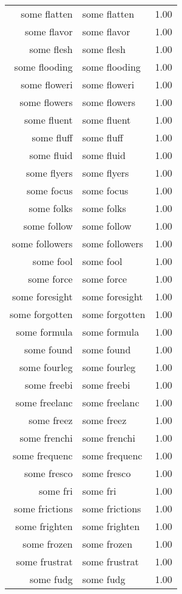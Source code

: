 \begin{table}[ht]
\begin{tabular}{rlr}
  some flatten & some flatten & 1.00 \\ 
  some flavor & some flavor & 1.00 \\ 
  some flesh & some flesh & 1.00 \\ 
  some flooding & some flooding & 1.00 \\ 
  some floweri & some floweri & 1.00 \\ 
  some flowers & some flowers & 1.00 \\ 
  some fluent & some fluent & 1.00 \\ 
  some fluff & some fluff & 1.00 \\ 
  some fluid & some fluid & 1.00 \\ 
  some flyers & some flyers & 1.00 \\ 
  some focus & some focus & 1.00 \\ 
  some folks & some folks & 1.00 \\ 
  some follow & some follow & 1.00 \\ 
  some followers & some followers & 1.00 \\ 
  some fool & some fool & 1.00 \\ 
  some force & some force & 1.00 \\ 
  some foresight & some foresight & 1.00 \\ 
  some forgotten & some forgotten & 1.00 \\ 
  some formula & some formula & 1.00 \\ 
  some found & some found & 1.00 \\ 
  some fourleg & some fourleg & 1.00 \\ 
  some freebi & some freebi & 1.00 \\ 
  some freelanc & some freelanc & 1.00 \\ 
  some freez & some freez & 1.00 \\ 
  some frenchi & some frenchi & 1.00 \\ 
  some frequenc & some frequenc & 1.00 \\ 
  some fresco & some fresco & 1.00 \\ 
  some fri & some fri & 1.00 \\ 
  some frictions & some frictions & 1.00 \\ 
  some frighten & some frighten & 1.00 \\ 
  some frozen & some frozen & 1.00 \\ 
  some frustrat & some frustrat & 1.00 \\ 
  some fudg & some fudg & 1.00 \\ 

\end{tabular}
\end{table}
